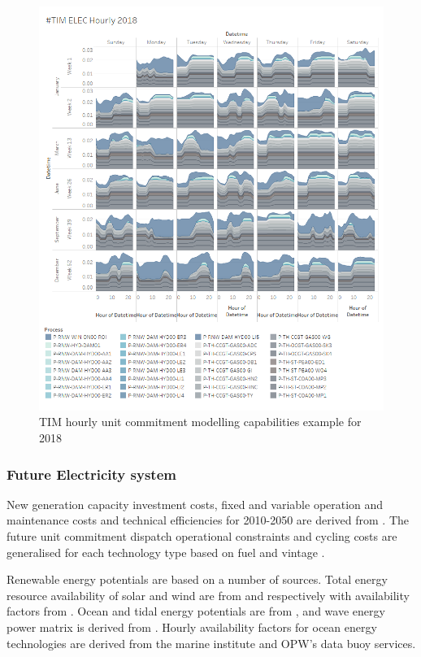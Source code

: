\documentclass[gmd,manuscript]{copernicus}
\begin{document}
\begin{figure}[!htbp]
 \centering
 \includegraphics[scale=0.6]{figures/TIM_Elec_Hourly.png} 
 \caption{TIM hourly unit commitment modelling capabilities example for 2018}
 \label{fig:TIM_HourlyELC}
\end{figure}

\subsubsection{Future Electricity system}
New generation capacity investment costs, fixed and variable operation and maintenance costs and technical efficiencies for 2010-2050 are derived from \citet{Carlsson2014}. The future unit commitment dispatch operational constraints and cycling costs are generalised for each technology type based on fuel and vintage \citep{Kumar2012}. 

Renewable energy potentials are based on a number of sources. Total energy resource availability of solar and wind are from \citet{Pfenninger2016} and \citet{Staffell2016} respectively with availability factors from \citet{Ruiz2019}. Ocean and tidal energy potentials are from \citet{ORourke2010}, and wave energy power matrix is derived from \citet{Nambiar2016}. Hourly availability factors for ocean energy technologies are derived from the marine institute and OPW's data buoy services.
\end{document}

